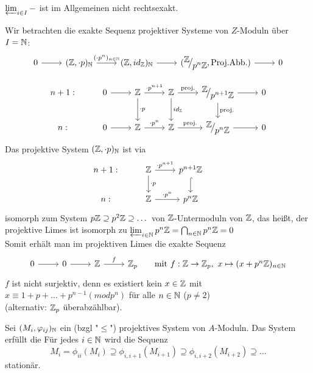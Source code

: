 \begin{anm}
	$\varprojlim_{i\in I}-$ ist im Allgemeinen nicht rechtsexakt.
\end{anm}
\begin{bsp} \label{16.26}
	Wir betrachten die exakte Sequenz projektiver Systeme von $Z$-Moduln über $ I = \mathbb{N} $: 
	$$\begin{tikzcd}  0 \arrow{r} & (\Z, \cdot p )_{\N} \arrow{r}{(\cdot p^n)_{n \in \N}} & (\Z, id_{\Z})_{\N} \arrow{r} & (\QR{\Z}{p^n \Z}, \text{Proj.Abb.}) \arrow{r} &  0 \end{tikzcd}$$
	
	$$\begin{tikzcd}
	n+1: & 0 \arrow{r} & \Z \arrow{r}{\cdot p^{n+1}} \arrow{d}{\cdot p}& \Z \arrow{r}{\text{proj.}} \arrow{d}{id_{\Z}} & \QR{\Z}{p^{n+1}\Z} \arrow{r} \arrow{d}{\text{proj.}} & 0 \\
	n:  &0 \arrow{r}& \Z \arrow{r}{\cdot p^n} & \Z \arrow{r}{\text{proj.}} & \QR{\Z}{p^n \Z} \arrow{r} & 0
	\end{tikzcd}$$
	Das projektive System $(\mathbb{Z}, \cdot p )_{\mathbb{N}}$ ist via 
	$$ \begin{tikzcd}
	n+1: & \Z \arrow{r}{\cdot p^{n+1}} \arrow{d}{\cdot p}& p^{n+1}\Z  \arrow[hook]{d} &  \\
	n:  & \Z \arrow{r}{\cdot p^n} & p^n \Z 
	\end{tikzcd}$$
	isomorph zum System $p\mathbb{Z} \supseteq p^2 \mathbb{Z} \supseteq \dots $ von $\mathbb{Z}$-Untermoduln von $\mathbb{Z}$, das heißt, der projektive Limes ist isomorph zu $\varprojlim_{i\in \mathbb{N}} p^n \mathbb{Z} = \bigcap_{n \in \mathbb{N}} p^n \mathbb{Z} = 0 $ \\
	Somit erhält man im projektiven Limes die exakte Sequenz 
	$$ \begin{tikzcd}
	0 \arrow{r} & 0 \arrow{r} &\Z \arrow{r}{f} & \Z_{p} \qquad  \text{mit} \  f: \Z \to \Z_{p}, \ x \mapsto (x+p^n \Z )_{n \in \N} \end{tikzcd}$$
	$f$ ist nicht surjektiv, denn es existiert kein $x \in \mathbb{Z} $ mit $x \equiv 1 +p + \dots + p^{n-1} (mod p^n) $ für alle $n \in \mathbb{N}$ ($p\neq 2$) \\
	(alternativ: $\mathbb{Z}_{p} $ überabzählbar).
\end{bsp}
\begin{df} \label{16.27}
	Sei $(M_i, \varphi_{ij})_{\mathbb{N}}$ ein (bzgl "$\leq$") projektives System von $A$-Moduln. Das System erfüllt die   Für jedes $i \in \mathbb{N} $ wird die Sequenz 
	$$ M_i = \phi_{ii}(M_i) \supseteq \phi_{i,i+1}(M_{i+1}) \supseteq \phi_{i,i+2}(M_{i+2}) \supseteq \dots $$ stationär. 
\end{df}
